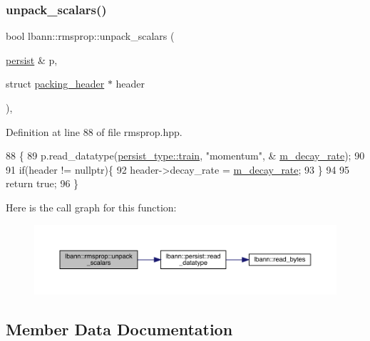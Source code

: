 \subsubsection{\texorpdfstring{unpack\+\_\+scalars()}{unpack\_scalars()}}
{\footnotesize\ttfamily bool lbann\+::rmsprop\+::unpack\+\_\+scalars (\begin{DoxyParamCaption}\item[{\hyperlink{classlbann_1_1persist}{persist} \&}]{p,  }\item[{struct \hyperlink{structlbann_1_1rmsprop_1_1packing__header}{packing\+\_\+header} $\ast$}]{header }\end{DoxyParamCaption})\hspace{0.3cm}{\ttfamily [inline]}, {\ttfamily [private]}}



Definition at line 88 of file rmsprop.\+hpp.


\begin{DoxyCode}
88                                                                 \{
89     p.read\_datatype(\hyperlink{namespacelbann_adee41f31f15f3906cbdcce4a1417eb56a61b3a8faa9c1091806675c230a9abe64}{persist\_type::train}, \textcolor{stringliteral}{"momentum"},  &
      \hyperlink{classlbann_1_1rmsprop_a9cd712c44e7c4995120e2933b0387d71}{m\_decay\_rate});
90     
91     \textcolor{keywordflow}{if}(header != \textcolor{keyword}{nullptr})\{
92       header->decay\_rate = \hyperlink{classlbann_1_1rmsprop_a9cd712c44e7c4995120e2933b0387d71}{m\_decay\_rate};
93     \}
94    
95   \textcolor{keywordflow}{return} \textcolor{keyword}{true};
96   \}
\end{DoxyCode}
Here is the call graph for this function\+:\nopagebreak
\begin{figure}[H]
\begin{center}
\leavevmode
\includegraphics[width=350pt]{classlbann_1_1rmsprop_a9b969263276b4d1aed93c3c82abf832d_cgraph}
\end{center}
\end{figure}


\subsection{Member Data Documentation}
\mbox{\label{classlbann_1_1rmsprop_a2bbaa35bb209e971a5ac9e1dbb6ece76}} 
